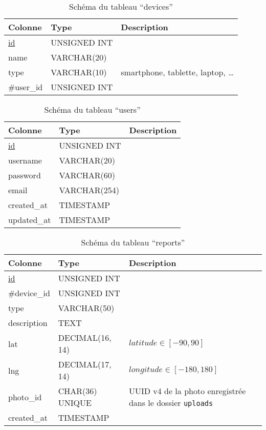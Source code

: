\begin{table}[H]
   \centering
   \begin{tabular}{|l|p{4cm}|p{8cm}|}
   \hline
   \textbf{Colonne} & \textbf{Type} & \textbf{Description} \\
   \hline
   \underline{id} & UNSIGNED INT &\\ \hline
   name &VARCHAR(20) &\\ \hline
   type & VARCHAR(10) & smartphone, tablette, laptop, \ldots\\ \hline
   \#user\_id & UNSIGNED INT & \\ \hline
   \end{tabular}
   \caption{Schéma du tableau ``devices''}
\end{table}

\begin{table}[H]
   \centering
   \begin{tabular}{|l|p{4cm}|p{8cm}|}
   \hline
   \textbf{Colonne} & \textbf{Type} & \textbf{Description} \\
   \hline
   \underline{id} & UNSIGNED INT &\\ \hline
   username & VARCHAR(20) & \\ \hline
   password & VARCHAR(60) & \\ \hline
   email & VARCHAR(254) & \cite{email-length} \\ \hline
   created\_at& TIMESTAMP & \\ \hline
   updated\_at & TIMESTAMP & \\ \hline
   \end{tabular}
   \caption{Schéma du tableau ``users''}
\end{table}

\begin{table}[H]
   \centering
   \begin{tabular}{|l|p{4cm}|p{8cm}|}
   \hline
   \textbf{Colonne} & \textbf{Type} & \textbf{Description} \\
   \hline
   \underline{id} & UNSIGNED INT &\\ \hline
   \#device\_id & UNSIGNED INT & \\ \hline
   type & VARCHAR(50) & \\ \hline
   description & TEXT & \\ \hline
   lat & DECIMAL(16, 14) & $latitude \in [-90, 90]$\\ \hline
   lng & DECIMAL(17, 14) & $longitude \in [-180, 180]$\\ \hline
   photo\_id & CHAR(36) UNIQUE & UUID v4 de la photo enregistrée dans le dossier \verb|uploads| \\ \hline
   created\_at & TIMESTAMP & \\ \hline
   \end{tabular}
   \caption{Schéma du tableau ``reports''}
\end{table}

